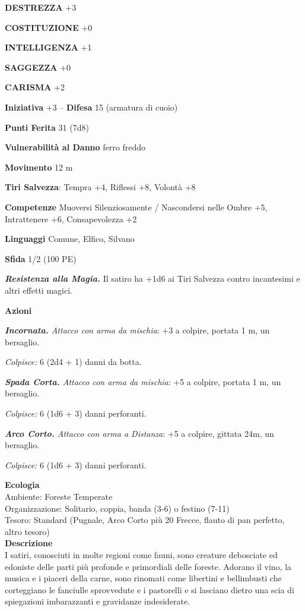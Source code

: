 \begin{multicols}{2}
\textbf{DESTREZZA} +3

\textbf{COSTITUZIONE} +0

\textbf{INTELLIGENZA} +1

\textbf{SAGGEZZA} +0

\textbf{CARISMA} +2

\textbf{Iniziativa} +3 -- \textbf{Difesa} 15 (armatura di cuoio)

\textbf{Punti Ferita} 31 (7d8)

\textbf{Vulnerabilità al Danno} ferro freddo

\textbf{Movimento} 12 m

\textbf{Tiri Salvezza}: Tempra +4, Riflessi +8, Volontà +8

\textbf{Competenze} Muoversi Silenziosamente / Nascondersi nelle Ombre +5, Intrattenere +6, Consapevolezza +2

\textbf{Linguaggi} Comune, Elfico, Silvano

\textbf{Sfida} 1/2 (100 PE)

\emph{\textbf{Resistenza alla Magia.}} Il satiro ha +1d6 ai Tiri Salvezza contro incantesimi e altri effetti magici.

\textbf{Azioni}

\emph{\textbf{Incornata.} Attacco con arma da mischia}: +3 a colpire, portata 1 m, un bersaglio.

\emph{Colpisce:} 6 (2d4 + 1) danni da botta.

\emph{\textbf{Spada Corta.} Attacco con arma da mischia}: +5 a colpire, portata 1 m, un bersaglio.

\emph{Colpisce:} 6 (1d6 + 3) danni perforanti.

\emph{\textbf{Arco Corto.} Attacco con arma a Distanza}: +5 a colpire, gittata 24m, un bersaglio.

\emph{Colpisce:} 6 (1d6 + 3) danni perforanti.

\textbf{Ecologia}\\
Ambiente: Foreste Temperate\\
Organizzazione: Solitario, coppia, banda (3-6) o festino (7-11)\\
Tesoro: Standard (Pugnale, Arco Corto più 20 Frecce, flauto di pan perfetto, altro tesoro)\\
\textbf{Descrizione}\\
I satiri, conosciuti in molte regioni come fauni, sono creature debosciate ed edoniste delle parti più profonde e primordiali delle foreste. Adorano il vino, la musica e i piaceri della carne, sono rinomati come libertini e bellimbusti che corteggiano le fanciulle sprovvedute e i pastorelli e si lasciano dietro una scia di spiegazioni imbarazzanti e gravidanze indesiderate.\\


\end{multicols}

